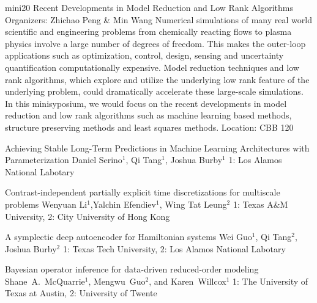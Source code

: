 \mini
{mini20}
{Recent Developments in Model Reduction and Low Rank Algorithms}
{Organizers: Zhichao Peng \& Min Wang}
{Numerical simulations of many real world scientific and engineering problems from chemically reacting flows to plasma physics involve a large number of degrees of freedom. This makes the outer-loop applications such as optimization, control, design, sensing and uncertainty quantification computationally expensive. Model reduction techniques and low rank algorithms, which explore and utilize the underlying low rank feature of the underlying problem, could dramatically accelerate these large-scale simulations. In this minisyposium, we would focus on the recent developments in model reduction and low rank algorithms such as machine learning based methods, structure preserving methods and least squares methods.}
{Location: CBB 120}

\begin{talks}
\item\talk
{Achieving Stable Long-Term Predictions in Machine Learning Architectures with Parameterization}
{Daniel Serino$^{1}$, Qi Tang$^{1}$, Joshua Burby$^{1}$}
{1: Los Alamos National Labotary}
\item\talk
{Contrast-independent partially explicit time discretizations for multiscale problems}
{Wenyuan Li$^{1}$,Yalchin Efendiev$^{1}$, Wing Tat Leung$^{2}$}
{1: Texas A\&M University, 2: City University of Hong Kong}
\item\talk
{A symplectic deep autoencoder for Hamiltonian systems}
{Wei Guo$^{1}$, Qi Tang$^{2}$, Joshua Burby$^{2}$}
{1: Texas Tech University, 2: Los Alamos National Labotary}
\item\talk
{Bayesian operator inference for data-driven reduced-order modeling}
{Shane~A.~McQuarrie$^{1}$, Mengwu~Guo$^{2}$, and Karen~Willcox$^{1}$}
{1: The University of Texas at Austin, 2: University of Twente}
\end{talks}
\room
